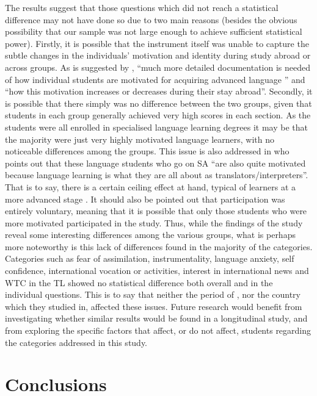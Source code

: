\documentclass[output=paper]{langsci/langscibook}
\begin{document}
The results suggest that those questions which did not reach a statistical difference may not have done so due to two main reasons (besides the obvious possibility that our sample was not large enough to achieve sufficient statistical power). Firstly, it is possible that the instrument itself was unable to capture the subtle changes in the individuals' motivation and identity during study abroad or across groups. As is suggested by \citet[318]{DeKeyser2014}, “much more detailed documentation is needed of how individual students are motivated for acquiring advanced language ” and “how this motivation increases or decreases during their stay abroad”. Secondly, it is possible that there simply was no difference between the two groups, given that students in each group generally achieved very high scores in each section. As the students were all enrolled in specialised language learning degrees it may be that the majority were just very highly motivated language learners, with no noticeable differences among the groups. This issue is also addressed in \citet[314]{DeKeyser2014} who points out that these language students who go on SA “are also quite motivated because language learning is what they are all about as translators/interpreters”. That is to say, there is a certain ceiling effect at hand, typical of learners at a more advanced stage \citep{Meara1994}. It should also be pointed out that participation was entirely voluntary, meaning that it is possible that only those students who were more motivated participated in the study. Thus, while the findings of the study reveal some interesting differences among the various groups, what is perhaps more noteworthy is this lack of differences found in the majority of the categories. Categories such as fear of assimilation, instrumentality, language anxiety,  self confidence, international vocation or activities, interest in international news and WTC in the TL showed no statistical difference both overall and in the individual questions. This is to say that neither the period of , nor the country which they studied in, affected these issues. Future research would benefit from investigating whether similar results would be found in a longitudinal study, and from exploring the specific factors that affect, or do not affect, students regarding the categories addressed in this study. 


\section{Conclusions}
\end{document}
